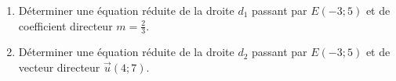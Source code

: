 
\begin{enumerate}
\item Déterminer une équation réduite de la droite $d_1$ passant par $E(-3;5)$ et de coefficient directeur $m=\frac{2}{3}$.
\item Déterminer une équation réduite de la droite $d_2$ passant par $E(-3;5)$ et de vecteur directeur $\vec{u}(4;7)$.
\end{enumerate}